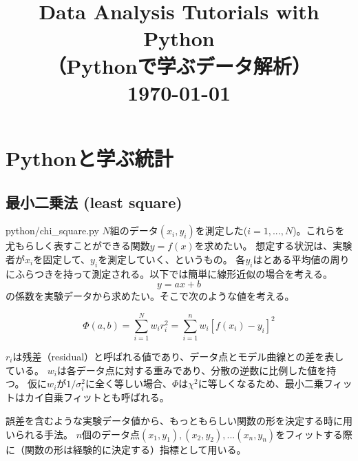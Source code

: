 \documentclass[oneside, uplatex]{jsbook}
\title
{
  \vspace{-2cm}
  \vspace{3cm}
  {\huge {\bf Data Analysis Tutorials with Python} }\\
  \vspace{3mm}
  {\bf （Pythonで学ぶデータ解析）} \\
  \vspace{3mm}
  \today\\
  \vspace{6cm}
}
\date{}
\begin{document}
\maketitle
\tableofcontents











\chapter{Pythonと学ぶ統計}
\section{最小二乗法 (least square)}
python/chi\_square.py
$N$組のデータ$(x_i,y_i)$を測定した($i=1,...,N$)。これらを尤もらしく表すことができる関数$y=f(x)$を求めたい。
想定する状況は、実験者が$x_i$を固定して、$y_i$を測定していく、というもの。
各$y_i$はとある平均値の周りにふらつきを持って測定される。以下では簡単に線形近似の場合を考える。
\begin{equation}
  y = ax + b
\end{equation}
の係数を実験データから求めたい。そこで次のような値を考える。

\begin{equation}
  \Phi(a,b) = \sum_{i=1}^{N} w_i r_i^{2} = \sum_{i=1}^{n} w_i[f(x_i)-y_i]^2
\end{equation}

$r_i$は残差（residual）と呼ばれる値であり、データ点とモデル曲線との差を表している。
$w_i$は各データ点に対する重みであり、分散の逆数に比例した値を持つ。
仮に$w_i$が$1/\sigma_i^2$に全く等しい場合、$\Phi$は$\chi^2$に等しくなるため、最小二乗フィットはカイ自乗フィットとも呼ばれる。


誤差を含むような実験データ値から、もっともらしい関数の形を決定する時に用いられる手法。
$n$個のデータ点$(x_1,y_1), (x_2,y_2), ... (x_n, y_n)$をフィットする際に（関数の形は経験的に決定する）指標として用いる。



\end{document}

